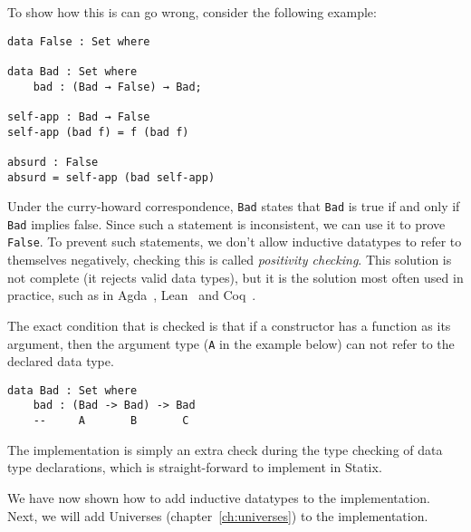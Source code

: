 To show how this is can go wrong, consider the following example:
\begin{lstlisting}
data False : Set where

data Bad : Set where
	bad : (Bad → False) → Bad;

self-app : Bad → False
self-app (bad f) = f (bad f)

absurd : False
absurd = self-app (bad self-app)
\end{lstlisting}

Under the curry-howard correspondence, \verb|Bad| states that \verb|Bad| is true if and only if \verb|Bad| implies false. Since such a statement is inconsistent, we can use it to prove \verb|False|. To prevent such statements, we don't allow inductive datatypes to refer to themselves negatively, checking this is called \emph{positivity checking}. This solution is not complete (it rejects valid data types), but it is the solution most often used in practice, such as in Agda~\cite{agda}, Lean~\cite{lean} and Coq~\cite{coq}.

The exact condition that is checked is that if a constructor has a function as its argument, then the argument type (\verb|A| in the example below) can not refer to the declared data type.

\begin{lstlisting}
data Bad : Set where
	bad : (Bad -> Bad) -> Bad
	--     A       B       C
\end{lstlisting}

The implementation is simply an extra check during the type checking of data type declarations, which is straight-forward to implement in Statix.

We have now shown how to add inductive datatypes to the implementation. Next, we will add  Universes (chapter~\ref{ch:universes}) to the implementation.
